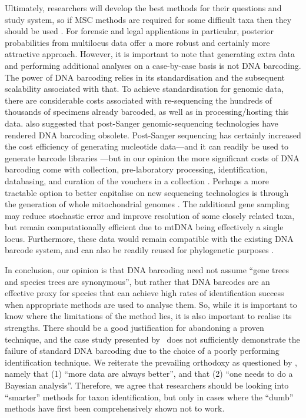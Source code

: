 \documentclass[12pt]{article}
\begin{document}
Ultimately, researchers will develop the best methods for their questions and study system, so if MSC methods are required for some difficult taxa then they should be used \citep{Dupuis2012}. For forensic and legal applications in particular, posterior probabilities from multilocus data offer a more robust and certainly more attractive approach. However, it is important to note that generating extra data and performing additional analyses on a case-by-case basis is not DNA barcoding. The power of DNA barcoding relies in its standardisation and the subsequent scalability associated with that. To achieve standardisation for genomic data, there are considerable costs associated with re-sequencing the hundreds of thousands of specimens already barcoded, as well as in processing/hosting this data. \citet{Taylor2012} also suggested that post-Sanger genomic-sequencing technologies have rendered DNA barcoding obsolete. Post-Sanger sequencing has certainly increased the cost efficiency of generating nucleotide data---and it can readily be used to generate barcode libraries \citep{Shokralla2014}---but in our opinion the more significant costs of DNA barcoding come with collection, pre-laboratory processing, identification, databasing, and curation of the vouchers in a collection \citep{Gregory2005,Borisenko2009,Puillandre2012a}. Perhaps a more tractable option to better capitalise on new sequencing technologies is through the generation of whole mitochondrial genomes \citep[see][]{Gillett2014}. The additional gene sampling may reduce stochastic error and improve resolution of some closely related taxa, but remain computationally efficient due to mtDNA being effectively a single locus. Furthermore, these data would remain compatible with the existing DNA barcode system, and can also be readily reused for phylogenetic purposes \citep{Gillett2014}.

In conclusion, our opinion is that DNA barcoding need not assume ``gene trees and species trees are synonymous'', but rather that DNA barcodes are an effective proxy for species that can achieve high rates of identification success when appropriate methods are used to analyse them. So, while it is important to know where the limitations of the method lies, it is also important to realise its strengths. There should be a good justification for abandoning a proven technique, and the case study presented by \citeauthor{Dowton2014}\ does not sufficiently demonstrate the failure of standard DNA barcoding due to the choice of a poorly performing identification technique.  We reiterate the prevailing orthodoxy as questioned by \citet{Karl2012}, namely that (1) ``more data are always better'', and that (2) ``one needs to do a Bayesian analysis''. Therefore, we agree that researchers should be looking into ``smarter'' methods for taxon identification, but only in cases where the ``dumb'' methods have first been comprehensively shown not to work.
\end{document}
